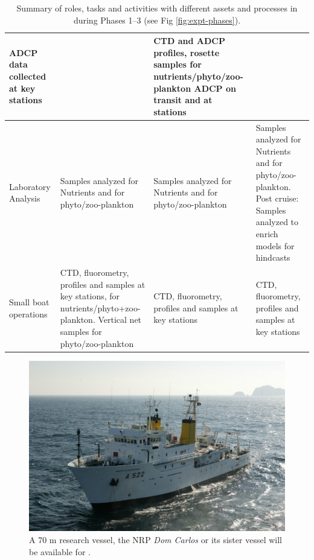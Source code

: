 \begin{table}[!t]
{\begin{tabular}{|p{3cm}|p{4cm}|p{4cm}|p{4cm}|}
                             ADCP data collected at key stations&&CTD
                                                                   and
                                                                   ADCP profiles,
                                                                   rosette
                                                                   samples
                                                                   for
                                                                   nutrients/phyto/zoo-plankton
                                                                   ADCP on transit and at stations\\
    \hline
    Laboratory Analysis&Samples analyzed for Nutrients and
                         for phyto/zoo-plankton&Samples analyzed for Nutrients and
                         for phyto/zoo-plankton&Samples analyzed for Nutrients and
                         for phyto/zoo-plankton. Post cruise:
                                                  Samples analyzed to
                                                 enrich models for hindcasts\\
    \hline
    Small boat operations&CTD, fluorometry, profiles and samples at key
                           stations, for nutrients/phyto+zoo-plankton.
                           Vertical net samples for phyto/zoo-plankton&CTD, fluorometry, profiles and samples at key
                           stations&CTD, fluorometry, profiles and samples at key
                           stations\\
    \hline    
  \end{tabular}
  \caption{Summary of roles, tasks and activities with different assets
    and processes in \proj during Phases 1--3 (see Fig
    \ref{fig:expt-phases}).}
    \label{tab:tasks}
  }
\end{table}


\begin{figure}
  \centering
  \includegraphics[scale=1.75]{fig/dom-carlos.jpg}
  \caption{A 70 m \inst research vessel, the NRP \emph{Dom Carlos} or
    its sister vessel will be available for \proje.}
  \vspace{-1cm}
 \label{fig:vessel}
\end{figure}


